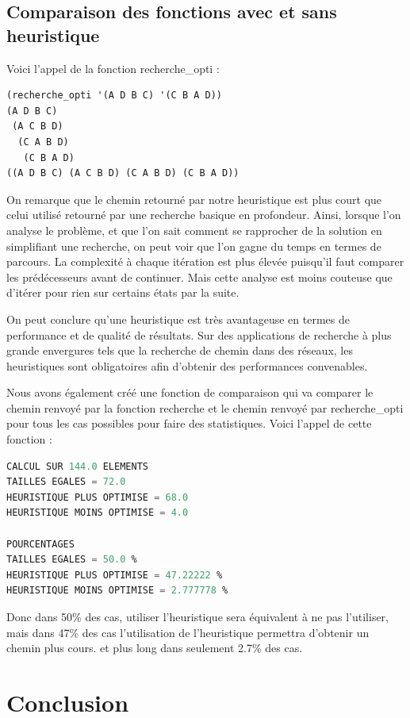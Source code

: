 \documentclass[a4paper,10pt]{report}
\begin{document}
  \section{Comparaison des fonctions avec et sans heuristique }
  
  Voici l’appel de la fonction recherche\_opti :
\begin{lstlisting}[language=Lisp]
(recherche_opti '(A D B C) '(C B A D))
(A D B C)
 (A C B D)
  (C A B D)
   (C B A D)
((A D B C) (A C B D) (C A B D) (C B A D))
\end{lstlisting}

On remarque que le chemin retourné par notre heuristique est plus court que celui utilisé retourné par une recherche basique en profondeur.
Ainsi, lorsque l’on analyse le problème, et que l’on sait comment se rapprocher de la solution en simplifiant une recherche, on peut voir que l’on gagne du temps en termes de parcours. La complexité à chaque itération est plus élevée puisqu’il faut comparer les prédécesseurs avant de continuer. Mais cette analyse est moins couteuse que d’itérer pour rien sur certains états par la suite.

On peut conclure qu’une heuristique est très avantageuse en termes de performance et de qualité de résultats. Sur des applications de recherche à plus grande envergures tels que la recherche de chemin dans des réseaux, les heuristiques sont obligatoires afin d’obtenir des performances convenables.

Nous avons également créé une fonction de comparaison qui va comparer le chemin renvoyé par la fonction recherche et le chemin renvoyé par recherche\_opti pour tous 
les cas possibles pour faire des statistiques. Voici l'appel de cette fonction : 

\begin{lstlisting}[language=Lisp]
CALCUL SUR 144.0 ELEMENTS
TAILLES EGALES = 72.0
HEURISTIQUE PLUS OPTIMISE = 68.0 
HEURISTIQUE MOINS OPTIMISE = 4.0

POURCENTAGES
TAILLES EGALES = 50.0 %
HEURISTIQUE PLUS OPTIMISE = 47.22222 % 
HEURISTIQUE MOINS OPTIMISE = 2.777778 %
\end{lstlisting}

Donc dans 50\% des cas, utiliser l'heuristique sera équivalent à ne pas l'utiliser, mais dans 47\% des cas l'utilisation de l'heuristique permettra d'obtenir un chemin plus
cours. et plus long dans seulement 2.7\% des cas.

\chapter*{Conclusion}
\end{document}
